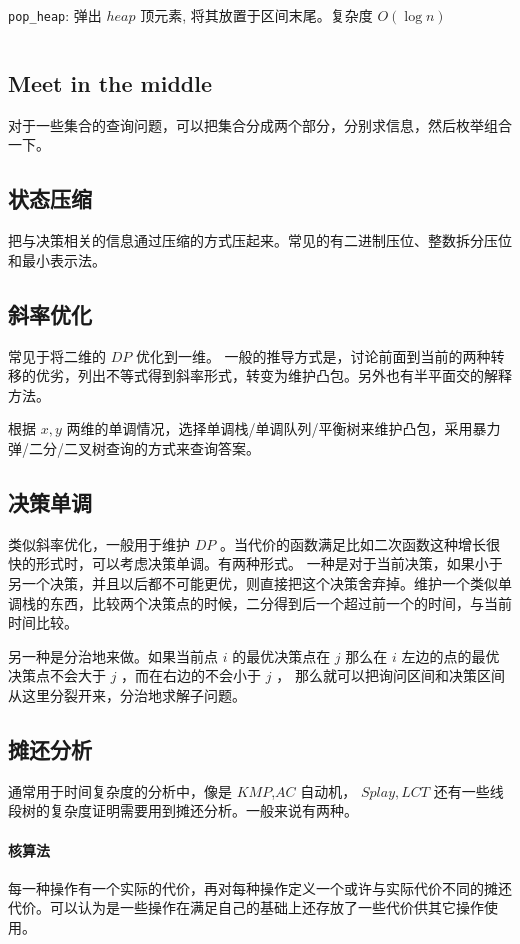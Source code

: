 \documentclass[UTF-8]{ctexart}
\newcommand{\cpp}[1]{\inputminted[bgcolor=bg,breaklines,breakanywhere=true]{c++}{#1}}
\begin{document}
			\texttt{pop_heap}: 弹出 $heap$ 顶元素, 将其放置于区间末尾。复杂度 $O(\log n)$
			
			\cpp{code//Other//stl-heap.cpp}

		\subsection{Meet in the middle}
		对于一些集合的查询问题，可以把集合分成两个部分，分别求信息，然后枚举组合一下。
		\subsection{状态压缩}
		把与决策相关的信息通过压缩的方式压起来。常见的有二进制压位、整数拆分压位和最小表示法。
		\subsection{斜率优化}
		常见于将二维的 $DP$ 优化到一维。
		一般的推导方式是，讨论前面到当前的两种转移的优劣，列出不等式得到斜率形式，转变为维护凸包。另外也有半平面交的解释方法。
		
		根据 $x,y$ 两维的单调情况，选择单调栈/单调队列/平衡树来维护凸包，采用暴力弹/二分/二叉树查询的方式来查询答案。
		\subsection{决策单调}
		类似斜率优化，一般用于维护 $DP$ 。当代价的函数满足比如二次函数这种增长很快的形式时，可以考虑决策单调。有两种形式。
		一种是对于当前决策，如果小于另一个决策，并且以后都不可能更优，则直接把这个决策舍弃掉。维护一个类似单调栈的东西，比较两个决策点的时候，二分得到后一个超过前一个的时间，与当前时间比较。
		
		另一种是分治地来做。如果当前点 $i$ 的最优决策点在 $j$ 那么在 $i$ 左边的点的最优决策点不会大于 $j$ ，而在右边的不会小于 $j$ ， 那么就可以把询问区间和决策区间从这里分裂开来，分治地求解子问题。
		\subsection{摊还分析}
		通常用于时间复杂度的分析中，像是 $KMP$,$AC$ 自动机， $Splay,LCT$ 还有一些线段树的复杂度证明需要用到摊还分析。一般来说有两种。
		\paragraph{核算法} 每一种操作有一个实际的代价，再对每种操作定义一个或许与实际代价不同的摊还代价。可以认为是一些操作在满足自己的基础上还存放了一些代价供其它操作使用。
\end{document}
